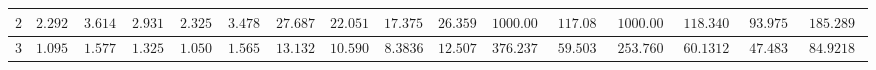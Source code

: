 \begin{landscape}
\begin{tabular}{|c|c|c|c|c|c|c|c|c|c|c|c|c|c|c|c}
$2$          & $2.2926$                                                        & $3.6143$                                                        & $2.9313$                                                          & $2.3258$                                                           & $3.4785$                                                              & $27.6879$                                                       & $22.0512$                                                         & $17.3752$                                                          & $26.3597$                                                             & $1000.0000$                                                     & $117.0830$                                                        & $1000.0000$                                                     & $118.34062$                                                        & $93.9752$                                                          & \multicolumn{1}{c|}{$185.28905$}                                                            \\ \hline
$3$          & $1.0952$                                                        & $1.5778$                                                        & $1.3250$                                                          & $1.0508$                                                           & $1.5655$                                                              & $13.1324$                                                       & $10.5907$                                                         & $8.3836$                                                           & $12.5078$                                                             & $376.2377$                                                      & $59.5036$                                                         & $253.76046$                                                      & $60.13129$                                                         & $47.48365$                                                          & \multicolumn{1}{c|}{$84.92186$}                                                             \\ \hline

\end{tabular}
\end{landscape}
